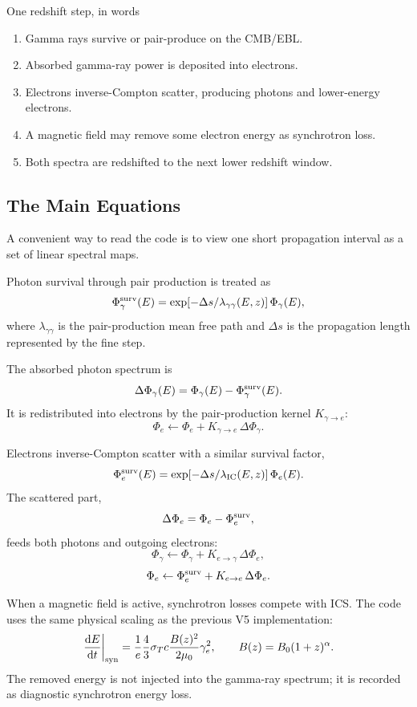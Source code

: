 \documentclass[11pt]{article}
\newcommand{\dd}{\mathrm{d}}
\begin{document}
\begin{physbox}{One redshift step, in words}
\begin{enumerate}
  \item Gamma rays survive or pair-produce on the CMB/EBL.
  \item Absorbed gamma-ray power is deposited into electrons.
  \item Electrons inverse-Compton scatter, producing photons and lower-energy electrons.
  \item A magnetic field may remove some electron energy as synchrotron loss.
  \item Both spectra are redshifted to the next lower redshift window.
\end{enumerate}
\end{physbox}

\subsection{The Main Equations}

A convenient way to read the code is to view one short propagation interval as
a set of linear spectral maps.

Photon survival through pair production is treated as
\[
  \Phi_\gamma^{\rm surv}(E)
  =
  \exp[-\Delta s/\lambda_{\gamma\gamma}(E,z)]\,
  \Phi_\gamma(E),
\]
where $\lambda_{\gamma\gamma}$ is the pair-production mean free path and
$\Delta s$ is the propagation length represented by the fine step.

The absorbed photon spectrum is
\[
  \Delta\Phi_\gamma(E)
  =
  \Phi_\gamma(E)-\Phi_\gamma^{\rm surv}(E).
\]
It is redistributed into electrons by the pair-production kernel
$K_{\gamma\rightarrow e}$:
\[
  \Phi_e \leftarrow
  \Phi_e + K_{\gamma\rightarrow e}\,\Delta\Phi_\gamma .
\]

Electrons inverse-Compton scatter with a similar survival factor,
\[
  \Phi_e^{\rm surv}(E)
  =
  \exp[-\Delta s/\lambda_{\rm IC}(E,z)]\,
  \Phi_e(E).
\]
The scattered part,
\[
  \Delta\Phi_e=\Phi_e-\Phi_e^{\rm surv},
\]
feeds both photons and outgoing electrons:
\[
  \Phi_\gamma \leftarrow \Phi_\gamma + K_{e\rightarrow\gamma}\,\Delta\Phi_e,
\]
\[
  \Phi_e \leftarrow \Phi_e^{\rm surv}
  + K_{e\rightarrow e}\,\Delta\Phi_e .
\]

When a magnetic field is active, synchrotron losses compete with ICS. The code
uses the same physical scaling as the previous V5 implementation:
\[
  \left.\frac{\dd E}{\dd t}\right|_{\rm syn}
  =
  \frac{1}{e}
  \frac{4}{3}\sigma_T c
  \frac{B(z)^2}{2\mu_0}
  \gamma_e^2,
  \qquad
  B(z)=B_0(1+z)^\alpha .
\]
The removed energy is not injected into the gamma-ray spectrum; it is recorded
as diagnostic synchrotron energy loss.
\end{document}
